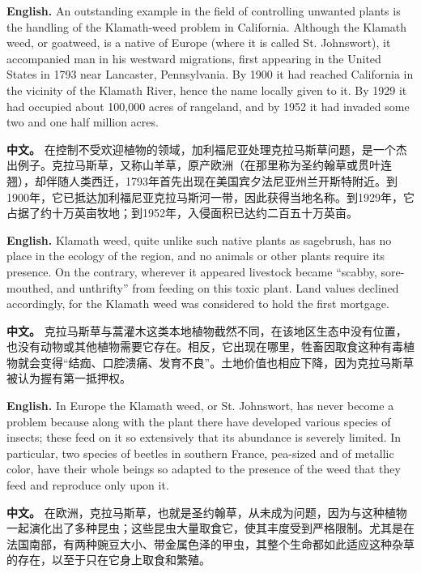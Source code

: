 \noindent\textbf{English.} An outstanding example in the field of controlling unwanted plants is the handling of the Klamath-weed problem in California. Although the Klamath weed, or goatweed, is a native of Europe (where it is called St. Johnswort), it accompanied man in his westward migrations, first appearing in the United States in 1793 near Lancaster, Pennsylvania. By 1900 it had reached California in the vicinity of the Klamath River, hence the name locally given to it. By 1929 it had occupied about 100,000 acres of rangeland, and by 1952 it had invaded some two and one half million acres.
\par
\noindent\textbf{中文。} 在控制不受欢迎植物的领域，加利福尼亚处理克拉马斯草问题，是一个杰出例子。克拉马斯草，又称山羊草，原产欧洲（在那里称为圣约翰草或贯叶连翘），却伴随人类西迁，1793年首先出现在美国宾夕法尼亚州兰开斯特附近。到1900年，它已抵达加利福尼亚克拉马斯河一带，因此获得当地名称。到1929年，它占据了约十万英亩牧地；到1952年，入侵面积已达约二百五十万英亩。
\par\medskip

\noindent\textbf{English.} Klamath weed, quite unlike such native plants as sagebrush, has no place in the ecology of the region, and no animals or other plants require its presence. On the contrary, wherever it appeared livestock became ``scabby, sore-mouthed, and unthrifty'' from feeding on this toxic plant. Land values declined accordingly, for the Klamath weed was considered to hold the first mortgage.
\par
\noindent\textbf{中文。} 克拉马斯草与蒿灌木这类本地植物截然不同，在该地区生态中没有位置，也没有动物或其他植物需要它存在。相反，它出现在哪里，牲畜因取食这种有毒植物就会变得“结痂、口腔溃痛、发育不良”。土地价值也相应下降，因为克拉马斯草被认为握有第一抵押权。
\par\medskip

\noindent\textbf{English.} In Europe the Klamath weed, or St. Johnswort, has never become a problem because along with the plant there have developed various species of insects; these feed on it so extensively that its abundance is severely limited. In particular, two species of beetles in southern France, pea-sized and of metallic color, have their whole beings so adapted to the presence of the weed that they feed and reproduce only upon it.
\par
\noindent\textbf{中文。} 在欧洲，克拉马斯草，也就是圣约翰草，从未成为问题，因为与这种植物一起演化出了多种昆虫；这些昆虫大量取食它，使其丰度受到严格限制。尤其是在法国南部，有两种豌豆大小、带金属色泽的甲虫，其整个生命都如此适应这种杂草的存在，以至于只在它身上取食和繁殖。
\par\medskip

